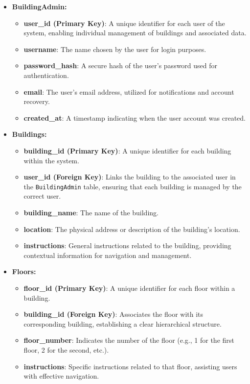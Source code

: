\begin{itemize}
	\item \textbf{BuildingAdmin:}  
	\begin{itemize}
		\item \textbf{user\_id (Primary Key)}: A unique identifier for each user of the system, enabling individual management of buildings and associated data.
		\item \textbf{username}: The name chosen by the user for login purposes.
		\item \textbf{password\_hash}: A secure hash of the user's password used for authentication.
		\item \textbf{email}: The user's email address, utilized for notifications and account recovery.
		\item \textbf{created\_at}: A timestamp indicating when the user account was created.
	\end{itemize}
	
	\item \textbf{Buildings:}  
	\begin{itemize}
		\item \textbf{building\_id (Primary Key)}: A unique identifier for each building within the system.
		\item \textbf{user\_id (Foreign Key)}: Links the building to the associated user in the \texttt{BuildingAdmin} table, ensuring that each building is managed by the correct user.
		\item \textbf{building\_name}: The name of the building.
		\item \textbf{location}: The physical address or description of the building's location.
		\item \textbf{instructions}: General instructions related to the building, providing contextual information for navigation and management.
	\end{itemize}
	
	\item \textbf{Floors:}  
	\begin{itemize}
		\item \textbf{floor\_id (Primary Key)}: A unique identifier for each floor within a building.
		\item \textbf{building\_id (Foreign Key)}: Associates the floor with its corresponding building, establishing a clear hierarchical structure.
		\item \textbf{floor\_number}: Indicates the number of the floor (e.g., 1 for the first floor, 2 for the second, etc.).
		\item \textbf{instructions}: Specific instructions related to that floor, assisting users with effective navigation.
	\end{itemize}
	

\end{itemize}
